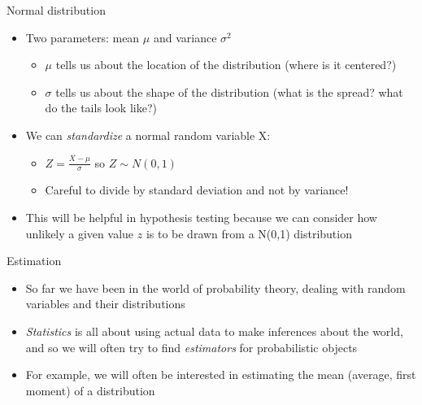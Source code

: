 \documentclass[aspectratio=169]{beamer}
\begin{document}
\begin{frame}{Normal distribution}
    \begin{itemize}
        \item Two parameters: mean $\mu$ and variance $\sigma^2$
        \begin{itemize}
            \item $\mu$ tells us about the location of the distribution (where is it centered?)
            \item $\sigma$ tells us about the shape of the distribution (what is the spread? what do the tails look like?)
        \end{itemize}
        \item We can \textit{standardize} a normal random variable X:
        \begin{itemize}
            \item $Z = \frac{X-\mu}{\sigma}$ so $Z \sim N(0,1)$
            \item Careful to divide by standard deviation and not by variance!
        \end{itemize}
        \item This will be helpful in hypothesis testing because we can consider how unlikely a given value $z$ is to be drawn from a N(0,1) distribution
    \end{itemize}
\end{frame}

\begin{frame}{Estimation}
    \begin{itemize}
        \item So far we have been in the world of probability theory, dealing with random variables and their distributions
        \item \textit{Statistics} is all about using actual data to make inferences about the world, and so we will often try to find \textit{estimators} for probabilistic objects
        \item For example, we will often be interested in estimating the mean (average, first moment) of a distribution
    \end{itemize}
\end{frame}
\end{document}
